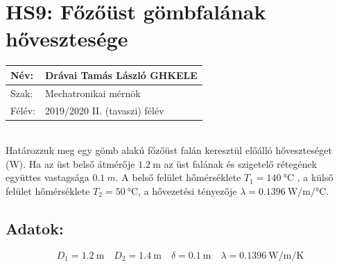
\section*{HS9: Főzőüst gömbfalának hővesztesége}
\begin{tabular}{ | p{2cm} | p{14cm} | } 
	\hline
	Név: & Drávai Tamás László GHKELE\\ 
	\hline
	Szak: & Mechatronikai mérnök \\ 
	\hline
	Félév: & 2019/2020 II. (tavaszi) félév \\ 
	\hline
\end{tabular}
\vspace{4mm} 
\\Határozzuk meg egy gömb alakú főzőüst falán keresztül előálló hőveszteséget (W).  Ha az üst belső átmérője $\SI{1,2}{\meter}$  az üst falának és szigetelő rétegének együttes vastagsága $\SI{0,1}{m}$. A belső felület hőmérséklete $T_1=\SI{140}{\celsius}$ , a külső felület hőmérséklete  $T_2=\SI{50}{\celsius}$,  a hővezetési tényezője $\lambda=\SI[per-mode=fraction]{0,1396}{\watt\per\meter\per\degreeCelsius}$.
\subsection*{ {Adatok:}}
\begin{equation*}
	D_1=\SI{1,2}{\meter}  \quad  D_2=\SI{1,4}{\meter} \quad \delta=\SI{0,1}{\meter}\quad
	\lambda=\SI[per-mode=fraction]{0,1396}{\watt\per\meter\per\kelvin}
\end{equation*}
